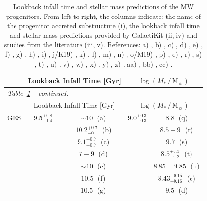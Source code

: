 \renewcommand{\arraystretch}{1.3}
\begin{longtable}{l|c c|c c}
    \caption{Lookback infall time and stellar mass predictions of the MW progenitors. From left to right, the columns indicate: the name of the progenitor accreted substructure (i), the lookback infall time and stellar mass predictions provided by GalactiKit (ii, iv) and studies from the literature (iii, v).
    References:
    a) \protect\cite{Gallart2019}, b) \protect\cite{Bonaca2020}, c) \protect\cite{Kruijssen2020}, d) \protect\cite{Hasselquist2021}, e) \protect\cite{Montalban2021}, f) \protect\cite{Naidu2022}, g) \protect\cite{GonzalezKoda2025}, h) \protect\cite{Woody2025}, i) \protect\cite{Kepley2007}, j/K19) \protect\cite{Koppelman2019}, k) \protect\cite{RuizLara2022b}, l) \protect\cite{Horta2021}, m) \protect\cite{Malhan2021}, n) \protect\cite{deBoer2015}, o/M19) \protect\cite{Myeong2019}, p) \protect\cite{Dodd2025}, q) \protect\cite{Helmi2018}, r) \protect\cite{Mackereth2019b}, s) \protect\cite{Vincenzo2019}, t) \protect\cite{Mackereth2020}, u) \protect\cite{Feuillet2020}, v) \protect\cite{Callingham2022}, w) \protect\cite{Han2022}, x) \protect\cite{Lane2023}, y) \protect\cite{Helmi1999a}, z) \protect\cite{Horta2025}, aa) \protect\cite{NiedersteOstholt2012}, bb) \protect\cite{McConnachie2012}, cc) \protect\cite{Koppelman2019}.}\label{tab:comb_lit}\\
    \hline
    & \multicolumn{2}{c|}{Lookback Infall Time [Gyr]} & \multicolumn{2}{c}{$\log (M_{*}\,/\,\text{M}_{\sun})$} \\
    \hline
    \endfirsthead
    \multicolumn{5}{l}{\small\textit{Table~\ref{tab:comb_lit} -- continued.}}\\
    \hline
    & \multicolumn{2}{c|}{Lookback Infall Time [Gyr]} & \multicolumn{2}{c}{$\log (M_{*}\,/\,\text{M}_{\sun})$} \\
    \hline
    \endhead
    \hline
    \endfoot
    \hline
    \endlastfoot
    GES & $9.5^{+0.8}_{-1.4}$ & $\sim10$ \,\,(a) & $9.0^{+0.3}_{-0.3}$ & $8.8$ \,\,(q) \\
    & & $10.2^{+0.2}_{-0.1}$ \,\,(b) & & $8.5-9$ \,\,(r) \\
    & & $9.1^{+0.7}_{-0.7}$ \,\,(c) & & $9.7$ \,\,(s) \\
    & & $7-9$ \,\,(d) & & $8.5^{+0.1}_{-0.2}$ \,\,(t) \\
    & & $\sim10$ \,\,(e) & & $8.85-9.85$ \,\,(u) \\
    & & $10.5$ \,\,(f) & & $8.43^{+0.15}_{-0.16}$ \,\,(c) \\
    & & $10.5$ \,\,(g) & & $9.5$ \,\,(d) \\

\end{longtable}
